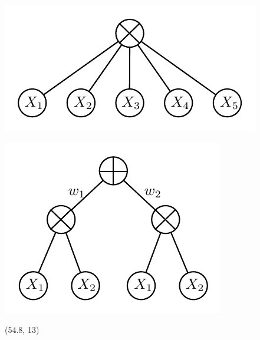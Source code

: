 \documentclass[final]{beamer}
\begin{document}
\begin{frame}{}
\begin{textblock}{25.2}
    
    \begin{minipage}{0.5\linewidth}
      \centering
      \includegraphics[width=0.65\linewidth]{figures/spn-prod}
    \end{minipage}\begin{minipage}{0.5\linewidth}
      \centering
      \includegraphics[width=0.55\linewidth]{figures/spn-sum}
    \end{minipage}
    
    
  \end{textblock}

  
  \begin{textblock}{25.2}(54.8, 13)
    \footnotesize
    \begin{minipage}{0.7\linewidth}
    

\end{minipage}
\end{textblock}
\end{frame}
\end{document}
